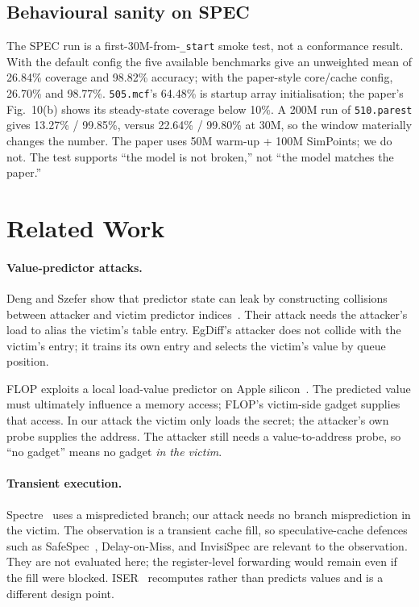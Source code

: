 \documentclass[conference]{IEEEtran}
\newcommand{\code}[1]{\texttt{\small #1}}
\begin{document}
\subsection{Behavioural sanity on SPEC}
The SPEC run is a first-30M-from-\code{\_start} smoke test, not a
conformance result. With the default config the five available
benchmarks give an unweighted mean of 26.84\% coverage and 98.82\%
accuracy; with the paper-style core/cache config, 26.70\% and 98.77\%.
\code{505.mcf}'s 64.48\% is startup array initialisation; the paper's
Fig.~10(b) shows its steady-state coverage below 10\%. A 200M run of
\code{510.parest} gives 13.27\% / 99.85\%, versus 22.64\% / 99.80\% at
30M, so the window materially changes the number. The paper uses 50M
warm-up + 100M SimPoints; we do not. The test supports ``the model is
not broken,'' not ``the model matches the paper.''

\section{Related Work}

\paragraph{Value-predictor attacks.}
Deng and Szefer show that predictor state can leak by constructing
collisions between attacker and victim predictor indices~\cite{deng}.
Their attack needs the attacker's load to alias the victim's table entry.
EgDiff's attacker does not collide with the victim's entry; it trains its
own entry and selects the victim's value by queue position.

FLOP exploits a local load-value predictor on Apple silicon~\cite{flop}.
The predicted value must ultimately influence a memory access; FLOP's
victim-side gadget supplies that access. In our attack the victim only
loads the secret; the attacker's own probe supplies the address. The
attacker still needs a value-to-address probe, so ``no gadget'' means no
gadget \emph{in the victim}.

\paragraph{Transient execution.}
Spectre~\cite{spectre} uses a mispredicted branch; our attack needs no
branch misprediction in the victim. The observation is a transient cache
fill, so speculative-cache defences such as SafeSpec~\cite{safespec},
Delay-on-Miss, and InvisiSpec are relevant to the observation. They are
not evaluated here; the register-level forwarding would remain even if
the fill were blocked. ISER~\cite{iser} recomputes rather than predicts
values and is a different design point.
\end{document}
